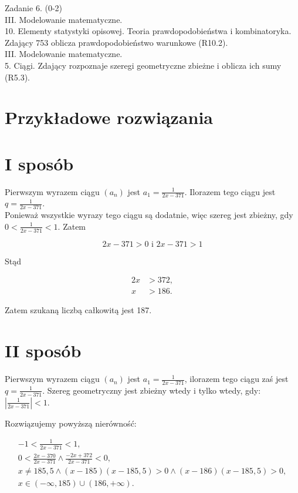 \documentclass[10pt]{article}
\begin{document}
Zadanie 6. (0-2)\\
III. Modelowanie matematyczne.\\
10. Elementy statystyki opisowej. Teoria prawdopodobieństwa i kombinatoryka. Zdający 753 oblicza prawdopodobieństwo warunkowe (R10.2).\\
III. Modelowanie matematyczne.\\
5. Ciągi. Zdający rozpoznaje szeregi geometryczne zbieżne i oblicza ich sumy (R5.3).

\section*{Przykładowe rozwiązania}
\section*{I sposób}
Pierwszym wyrazem ciągu $\left(a_{n}\right)$ jest $a_{1}=\frac{1}{2 x-371}$. Ilorazem tego ciągu jest $q=\frac{1}{2 x-371}$.\\
Ponieważ wszystkie wyrazy tego ciągu są dodatnie, więc szereg jest zbieżny, gdy $0<\frac{1}{2 x-371}<1$. Zatem

$$
2 x-371>0 \text { i } 2 x-371>1
$$

Stąd

$$
\begin{aligned}
2 x & >372, \\
x & >186 .
\end{aligned}
$$

Zatem szukaną liczbą całkowitą jest 187.

\section*{II sposób}
Pierwszym wyrazem ciągu $\left(a_{n}\right)$ jest $a_{1}=\frac{1}{2 x-371}$, ilorazem tego ciągu zaś jest $q=\frac{1}{2 x-371}$. Szereg geometryczny jest zbieżny wtedy i tylko wtedy, gdy: $\left|\frac{1}{2 x-371}\right|<1$.

Rozwiązujemy powyższą nierówność:

$$
\begin{gathered}
-1<\frac{1}{2 x-371}<1, \\
0<\frac{2 x-370}{2 x-371} \wedge \frac{-2 x+372}{2 x-371}<0, \\
x \neq 185,5 \wedge(x-185)(x-185,5)>0 \wedge(x-186)(x-185,5)>0, \\
x \in(-\infty, 185) \cup(186,+\infty) .
\end{gathered}
$$
\end{document}
